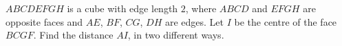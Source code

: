 $ABCDEFGH$ is a cube with edge length $2$, where $ABCD$ and $EFGH$ are opposite faces and $AE$, $BF$, $CG$, $DH$ are edges. Let $I$ be the centre of the face $BCGF$. Find the distance $AI$, in two different ways.
